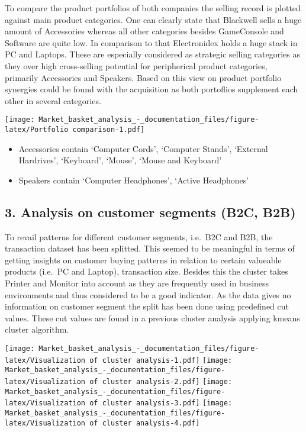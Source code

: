 \documentclass[]{article}
\providecommand{\tightlist}{%
  \setlength{\itemsep}{0pt}\setlength{\parskip}{0pt}}
\begin{document}
To compare the product portfolios of both companies the selling record
is plotted against main product categories. One can clearly state that
Blackwell sells a huge amount of Accessories whereas all other
categories besides GameConsole and Software are quite low. In comparison
to that Electronidex holds a huge stack in PC and Laptops. These are
especially considered as strategic selling categories as they over high
cross-selling potential for peripherical product categories, primarily
Accessories and Speakers. Based on this view on product portfolio
synergies could be found with the acquisition as both portoflios
supplement each other in several categories.

\texttt{[image: Market\_basket\_analysis\_-\_documentation\_files/figure-latex/Portfolio comparison-1.pdf]}

\begin{itemize}
\tightlist
\item
  Accessories contain `Computer Cords', `Computer Stands', `External
  Hardrives', `Keyboard', `Mouse', `Mouse and Keyboard'\\
\item
  Speakers contain `Computer Headphones', `Active Headphones'
\end{itemize}

\hypertarget{analysis-on-customer-segments-b2c-b2b}{%
\subsection{3. Analysis on customer segments (B2C,
B2B)}\label{analysis-on-customer-segments-b2c-b2b}}

To revail patterns for different customer segments, i.e.~B2C and B2B,
the transaction dataset has been splitted. This seemed to be meaningful
in terms of getting insights on customer buying patterns in relation to
certain valueable products (i.e.~PC and Laptop), transaction size.
Besides this the cluster takes Printer and Monitor into account as they
are frequently used in business environments and thus considered to be a
good indicator. As the data gives no information on customer segment the
split has been done using predefined cut values. These cut values are
found in a previous cluster analysis applying kmeans cluster algorithm.

\texttt{[image: Market\_basket\_analysis\_-\_documentation\_files/figure-latex/Visualization of cluster analysis-1.pdf]}
\texttt{[image: Market\_basket\_analysis\_-\_documentation\_files/figure-latex/Visualization of cluster analysis-2.pdf]}
\texttt{[image: Market\_basket\_analysis\_-\_documentation\_files/figure-latex/Visualization of cluster analysis-3.pdf]}
\texttt{[image: Market\_basket\_analysis\_-\_documentation\_files/figure-latex/Visualization of cluster analysis-4.pdf]}
\end{document}
